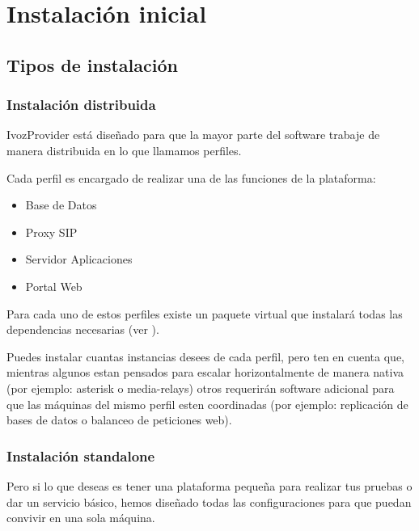 \documentclass[letterpaper,10pt,spanish]{sphinxmanual}
\begin{document}
\chapter{Instalación inicial}
\label{basic_concepts/installation/index::doc}\label{basic_concepts/installation/index:initial-installation}

\section{Tipos de instalación}
\label{basic_concepts/installation/install_types::doc}\label{basic_concepts/installation/install_types:installation-types}

\subsection{Instalación distribuida}
\label{basic_concepts/installation/install_types:distributed-install}
IvozProvider está diseñado para que la mayor parte del software trabaje de manera distribuida en lo que llamamos perfiles.

Cada perfil es encargado de realizar una de las funciones de la plataforma:
\begin{itemize}
\item {} 
Base de Datos

\item {} 
Proxy SIP

\item {} 
Servidor Aplicaciones

\item {} 
Portal Web

\end{itemize}

Para cada uno de estos perfiles existe un paquete virtual que instalará todas las dependencias necesarias (ver {\hyperref[basic_concepts/installation/debian_install:installing\string-profile\string-package]{}}).

Puedes instalar cuantas instancias desees de cada perfil, pero ten en cuenta que, mientras algunos estan pensados para escalar horizontalmente de manera nativa (por ejemplo: asterisk o media-relays) otros requerirán software adicional para que las máquinas del mismo perfil esten coordinadas (por ejemplo: replicación de bases de datos o balanceo de peticiones web).


\subsection{Instalación standalone}
\label{basic_concepts/installation/install_types:standalone-install}
Pero si lo que deseas es tener una plataforma pequeña para realizar tus pruebas o dar un servicio básico, hemos diseñado todas las configuraciones para que puedan convivir en una sola máquina.
\end{document}
